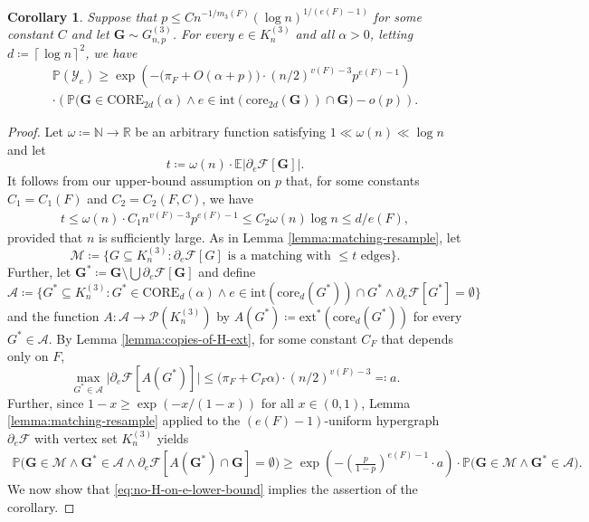 \documentclass[11pt,a4paper,oneside,reqno]{amsart}
\newtheorem{cor}[thm]{Corollary}
\newcommand{\Gnp}{G_{n, p}^{(3)}}
\newcommand{\bG}{\mathbf{G}}
\newcommand{\bGs}{\mathbf{G^*}}
\newcommand{\NN}{\mathbb{N}}
\newcommand{\RR}{\mathbb{R}}
\newcommand{\cA}{\mathcal{A}}
\newcommand{\cF}{\mathcal{F}}
\newcommand{\cM}{\mathcal{M}}
\newcommand{\cP}{\mathcal{P}}
\newcommand{\cY}{\mathcal{Y}}
\renewcommand{\Pr}{\mathbb{P}}
\newcommand{\Ex}{\mathbb{E}}
\newcommand{\1}{\mathbbm{1}} %
\renewcommand{\le}{\leqslant}
\renewcommand{\ge}{\geqslant}
\newcommand{\ext}{\mathrm{ext}}
\renewcommand{\int}{\mathrm{int}}
\newcommand{\core}{\mathrm{core}}
\newcommand{\Core}{\mathrm{CORE}}
\begin{document}
\begin{cor}
  \label{cor:Pr-Ye-lower}
  Suppose that $p \le C n^{-1/m_3(F)} (\log n)^{1/(e(F)-1)}$ for some constant $C$ and let $\bG \sim \Gnp$.
  For every $e \in K_n^{(3)}$ and all $\alpha > 0$, letting $d \coloneqq \left\lceil \log n \right\rceil^2$, we have
  \begin{multline*}
    \Pr(\cY_e) \ge \exp\left(- \big(\pi_F + O(\alpha+p)\big) \cdot (n/2)^{v(F)-3}p^{e(F)-1}\right) \\
    \cdot \left(\Pr\big(\bG \in \Core_{2d}(\alpha) \wedge e \in \int(\core_{2d}(\bG)) \cap \bG\big) - o(p)\right).
  \end{multline*}
\end{cor}
\begin{proof}
  Let $\omega \coloneqq \NN \to \RR$ be an arbitrary function satisfying $1 \ll \omega(n) \ll \log n$ and let
  \[
    t \coloneqq \omega(n) \cdot \Ex|\partial_e\cF[\bG]|.
  \]
  It follows from our upper-bound assumption on $p$ that, for some constants $C_1 = C_1(F)$ and $C_2 = C_2(F,C)$, we have
  \begin{align}
    \label{eq:t-upper}
    t \le \omega(n) \cdot C_1n^{v(F)-3}p^{e(F)-1} \le C_2 \omega(n) \log n \le d/e(F),
  \end{align}
  provided that $n$ is sufficiently large.
  As in Lemma \ref{lemma:matching-resample}, let
  \[
    \cM \coloneqq \big\{G \subseteq K_n^{(3)} : \partial_e\cF[G] \text{ is a matching with $\le t$ edges}\big\}.
  \]
  Further, let $\bGs \coloneqq \bG \setminus \bigcup \partial_e \cF[\bG]$ and define
  \[
    \cA \coloneqq \big\{G^* \subseteq K_n^{(3)} : G^* \in \Core_{d}(\alpha) \wedge e \in \int(\core_d(G^*)) \cap G^* \wedge \partial_e\cF[G^*] = \emptyset\big\}
  \]
  and the function $A \colon \cA \to \cP(K_n^{(3)})$ by $A(G^*) \coloneqq \ext^*(\core_d(G^*))$ for every $G^* \in \cA$.  By Lemma \ref{lemma:copies-of-H-ext}, for some constant $C_F$ that depends only on $F$,
  \[
    \max_{G^* \in \cA}\big|\partial_e\cF[A(G^*)]\big| \le \big(\pi_F + C_F\alpha\big) \cdot (n/2)^{v(F)-3} \eqqcolon a.
  \]
  Further, since $1-x \ge \exp(-x/(1-x))$ for all $x \in (0,1)$, Lemma \ref{lemma:matching-resample} applied to the $(e(F)-1)$-uniform hypergraph $\partial_e \cF$ with vertex set $K_n^{(3)}$ yields
  \begin{align}\label{eq:no-H-on-e-lower-bound}
    \Pr\big(\bG \in \cM \wedge \bGs \in \cA \wedge \partial_e\cF[A(\bGs) \cap \bG] = \emptyset\big) 
    \ge \exp\left(-\left(\frac{p}{1-p}\right)^{e(F)-1} \cdot a\right) \cdot \Pr\big(\bG \in \cM \wedge \bGs \in \cA\big).
  \end{align}
  We now show that \eqref{eq:no-H-on-e-lower-bound} implies the assertion of the corollary.
  

\end{proof}
\end{document}
